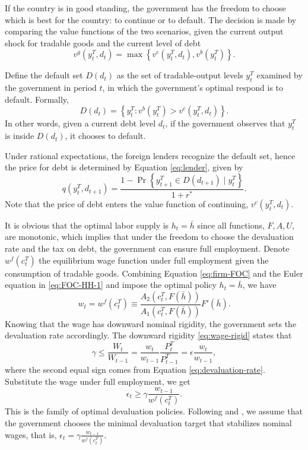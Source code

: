 If the country is in good standing, the government has the freedom to choose which is best for the country: to continue or to default. The decision is made by comparing the value functions of the two scenarios, given the current output shock for tradable goods and the current level of debt
\begin{equation}
    \label{eq:vg}
    v^g(y^T_t, d_t) = \max\left\{
        v^c(y^T_t, d_t) ,
        v^b(y^T_t)
     \right\}.
\end{equation}

Define the default set $D(d_t)$ as the set of tradable-output levels $y^T_t$ examined by the government in period $t$, in which the government's optimal respond is to default. Formally,
\begin{equation}
    \label{eq:default-set}
    D(d_t) = \left\{ 
        y^T_t : v^b(y^T_t) > v^c(y^T_t, d_t)
     \right\}.
\end{equation}
In other words, given a current debt level $d_t$, if the government observes that $y^T_t$ is inside $D(d_t)$, it chooses to default.

Under rational expectations, the foreign lenders recognize the default set, hence the price for debt is determined by Equation \eqref{eq:lender}, given by
\begin{equation}
    q(y^T_t, d_{t+1}) =
    \frac{1 - \Pr\left\{ y^T_{t+1} \in D(d_{t+1}) \mid y^T_t \right\}}{1 + r^*}.
\end{equation}
Note that the price of debt enters the value function of continuing, $v^c(y^T_t, d_{t})$.

It is obvious that the optimal labor supply is $h_t = \bar{h}$ since all functions, $F, A, U$, are monotonic, which implies that under the freedom to choose the devaluation rate and the tax on debt, the government can ensure full employment. Denote $w^f(c^T_t)$ the equilibrium wage function under full employment given the consumption of tradable goods. Combining Equation \eqref{eq:firm-FOC} and the Euler equation in \eqref{eq:FOC-HH-1} and impose the optimal policy $h_t = \bar{h}$, we have
\begin{equation}
    w_t = w^f(c^T_t) \equiv \frac{A_2(c^T_t, F(\bar{h}))}{A_1(c^T_t, F(\bar{h}))} F'(\bar{h}).
\end{equation}
Knowing that the wage has downward nominal rigidity, the government sets the devaluation rate accordingly. The downward rigidity \eqref{eq:wage-rigid} states that
\begin{equation*}
    \gamma \le \frac{W_t}{W_{t-1}} = \frac{w_t}{w_{t-1}} \frac{P^T_t}{P^T_{t-1}} = \epsilon \frac{w_t}{w_{t-1}},
\end{equation*}
where the second equal sign comes from Equation \eqref{eq:devaluation-rate}. Substitute the wage under full employment, we get
\begin{equation}
    \epsilon_t \ge \gamma \frac{w_{t-1}}{w^f(c^T_t)}.
\end{equation}
This is the family of optimal devaluation policies. Following \citet{Na-18} and \citet*{Hinrichsen_2020-chapter4}, we assume that the government chooses the minimal devaluation target that stabilizes nominal wages, that is, $
    \epsilon_t = \gamma \frac{w_{t-1}}{w^f(c^T_t)}.
$